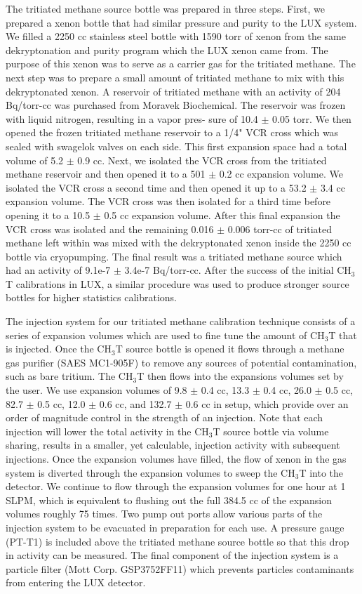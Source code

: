 \documentclass[a4paper,12pt]{article}
\begin{document}
{The tritiated methane source bottle was prepared in three steps. First, we prepared a xenon bottle that had similar pressure and purity to the LUX system. We filled a 2250 cc stainless steel bottle with 1590 torr of xenon from the same dekryptonation and purity
program which the LUX xenon came from. The purpose of this xenon was to serve as a carrier gas for the tritiated methane. The next step was to prepare a small amount of tritiated methane to mix with
this dekryptonated xenon. A reservoir of tritiated methane with an activity of 204 Bq/torr-cc was purchased from Moravek Biochemical. The reservoir was frozen with liquid nitrogen, resulting in a vapor pres-
sure of 10.4 $\pm$ 0.05 torr. We then opened the frozen tritiated methane reservoir to a 1/4" VCR cross which was sealed with swagelok valves on each side. This first expansion space had a total volume of 5.2 $\pm$ 0.9 cc. Next, we isolated the VCR cross from the tritiated
methane reservoir and then opened it to a 501 $\pm$ 0.2 cc expansion volume. We isolated the VCR cross a second time and then opened it up to a 53.2 $\pm$ 3.4 cc expansion volume. The VCR cross was then isolated for a third time before opening it to a 10.5 $\pm$ 0.5 cc expansion volume. After this final expansion the VCR cross was isolated and the remaining 0.016 $\pm$ 0.006 torr-cc of tritiated methane left within was mixed with the dekryptonated xenon inside the 2250 cc bottle via cryopumping. The final result was a tritiated methane source which had an activity of 9.1e-7 $\pm$ 3.4e-7 Bq/torr-cc.  After the success of the initial CH$_3$T calibrations in LUX, a similar procedure was used to produce stronger source bottles for higher statistics calibrations.

The injection system for our tritiated methane calibration technique consists of a series of expansion volumes which are used to fine tune the amount of CH$_3$T that is injected. Once the CH$_3$T source bottle is opened it flows through a methane gas purifier (SAES MC1-905F) to remove any sources of potential contamination, such as bare tritium. The CH$_3$T then flows into the expansions volumes set by the
user. We use expansion volumes of 9.8 $\pm$ 0.4 cc, 13.3 $\pm$ 0.4 cc, 26.0 $\pm$ 0.5 cc, 82.7 $\pm$ 0.5 cc, 12.0 $\pm$ 0.6 cc, and 132.7 $\pm$ 0.6 cc in setup, which provide over an order of magnitude control in the strength of an injection. Note that each injection will lower the total activity in the CH$_3$T source bottle via volume sharing, results in a smaller, yet calculable, injection activity with subsequent injections. Once the expansion volumes
have filled, the flow of xenon in the gas system is diverted through the expansion volumes to sweep the CH$_3$T into the detector. We continue to flow through the expansion volumes for one hour at 1 SLPM, which is equivalent to flushing out the full 384.5 cc of the expansion volumes roughly 75 times. Two pump out ports allow various parts of the injection system to be evacuated in preparation for each use. A pressure gauge (PT-T1) is included above the tritiated methane source
bottle so that this drop in activity can be measured. The final component of the injection system is a particle filter (Mott Corp. GSP3752FF11) which prevents particles contaminants from entering the LUX detector.

}
\end{document}
